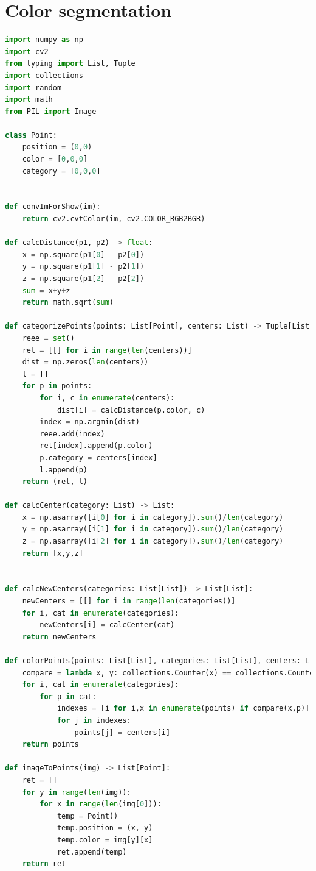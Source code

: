 \documentclass{article}
\begin{document}
\begin{appendices}
\begin{lstlisting}[language=python]
        \end{lstlisting}
        \section{Color segmentation}
        \label{appendix:color}
        \begin{lstlisting}[language=python]
import numpy as np
import cv2
from typing import List, Tuple
import collections
import random
import math
from PIL import Image

class Point:
    position = (0,0)
    color = [0,0,0]
    category = [0,0,0]


def convImForShow(im):
    return cv2.cvtColor(im, cv2.COLOR_RGB2BGR)

def calcDistance(p1, p2) -> float:
    x = np.square(p1[0] - p2[0])
    y = np.square(p1[1] - p2[1])
    z = np.square(p1[2] - p2[2])
    sum = x+y+z
    return math.sqrt(sum)

def categorizePoints(points: List[Point], centers: List) -> Tuple[List[List], List[Point]]:
    reee = set()
    ret = [[] for i in range(len(centers))]
    dist = np.zeros(len(centers))
    l = []
    for p in points:
        for i, c in enumerate(centers):
            dist[i] = calcDistance(p.color, c)
        index = np.argmin(dist)
        reee.add(index)
        ret[index].append(p.color)
        p.category = centers[index]
        l.append(p)
    return (ret, l)

def calcCenter(category: List) -> List:
    x = np.asarray([i[0] for i in category]).sum()/len(category)
    y = np.asarray([i[1] for i in category]).sum()/len(category)
    z = np.asarray([i[2] for i in category]).sum()/len(category)
    return [x,y,z]


def calcNewCenters(categories: List[List]) -> List[List]:
    newCenters = [[] for i in range(len(categories))]
    for i, cat in enumerate(categories):
        newCenters[i] = calcCenter(cat)
    return newCenters

def colorPoints(points: List[List], categories: List[List], centers: List[List]) -> List[List]:
    compare = lambda x, y: collections.Counter(x) == collections.Counter(y)
    for i, cat in enumerate(categories):
        for p in cat:
            indexes = [i for i,x in enumerate(points) if compare(x,p)]
            for j in indexes:
                points[j] = centers[i]
    return points

def imageToPoints(img) -> List[Point]:
    ret = []
    for y in range(len(img)):
        for x in range(len(img[0])):
            temp = Point()
            temp.position = (x, y)
            temp.color = img[y][x]
            ret.append(temp)
    return ret


\end{lstlisting}
\end{appendices}
\end{document}
